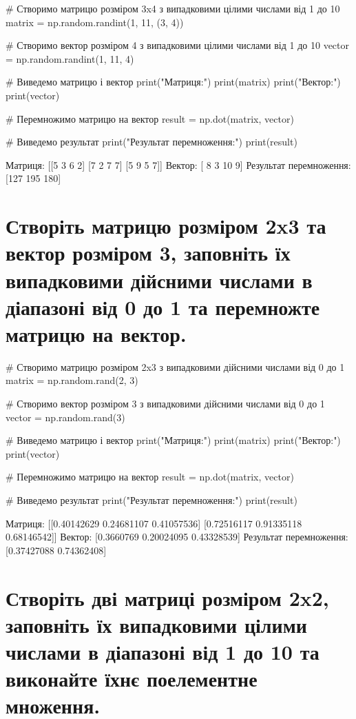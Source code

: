 \documentclass[]{article}
\newcounter{pythoncode}
\begin{document}
\begin{pythoncode}
    # Створимо матрицю розміром 3x4 з випадковими цілими числами від 1 до 10
    matrix = np.random.randint(1, 11, (3, 4))

    # Створимо вектор розміром 4 з випадковими цілими числами від 1 до 10
    vector = np.random.randint(1, 11, 4)

    # Виведемо матрицю і вектор
    print("Матриця:")
    print(matrix)
    print("Вектор:")
    print(vector)

    # Перемножимо матрицю на вектор
    result = np.dot(matrix, vector)

    # Виведемо результат
    print("Результат перемноження:")
    print(result)
\end{pythoncode}

\begin{out}
	Матриця:
	[[5 3 6 2]
	 [7 2 7 7]
	 [5 9 5 7]]
	Вектор:
	[ 8  3 10  9]
	Результат перемноження:
	[127 195 180]
\end{out}

\section{Створіть матрицю розміром 2x3 та вектор розміром 3, заповніть їх випадковими дійсними числами в діапазоні від 0 до 1 та перемножте матрицю на вектор.}

\begin{pythoncode}
    # Створимо матрицю розміром 2x3 з випадковими дійсними числами від 0 до 1
    matrix = np.random.rand(2, 3)

    # Створимо вектор розміром 3 з випадковими дійсними числами від 0 до 1
    vector = np.random.rand(3)

    # Виведемо матрицю і вектор
    print("Матриця:")
    print(matrix)
    print("Вектор:")
    print(vector)

    # Перемножимо матрицю на вектор
    result = np.dot(matrix, vector)

    # Виведемо результат
    print("Результат перемноження:")
    print(result)
\end{pythoncode}

\begin{out}
    Матриця:
    [[0.40142629 0.24681107 0.41057536]
     [0.72516117 0.91335118 0.68146542]]
    Вектор:
    [0.3660769  0.20024095 0.43328539]
    Результат перемноження:
    [0.37427088 0.74362408]
\end{out}

\section{Створіть дві матриці розміром 2x2, заповніть їх 	випадковими цілими числами в діапазоні від 1 до 10 та виконайте їхнє 	поелементне 	множення.}
\end{document}
